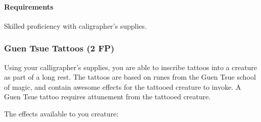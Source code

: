    \paragraph{Requirements} Skilled proficiency with caligrapher's supplies.
\subsubsection{Guen Tsue Tattoos (2 FP)} \label{feat::guentsuetattoos}
    Using your calligrapher's supplies, you are able to inscribe tattoos into a creature as part of a long rest.
    The tattoos are based on runes from the Guen Tsue school of magic, and contain awesome effects for the tattooed creature to invoke.
    A Guen Tsue tattoo requires attunement from the tattooed creature.

    The effects available to you creature:
